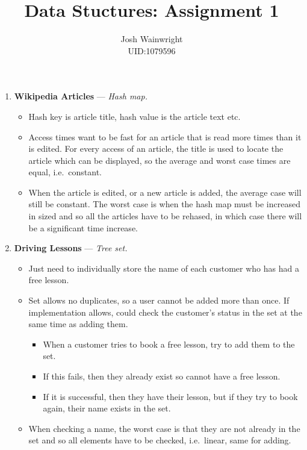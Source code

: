 \documentclass[11pt]{article} %
\author{Josh Wainwright \\ UID:1079596}
\title{Data Stuctures: Assignment 1 }
\date{}
\begin{document}
\maketitle

\begin{enumerate}
	\item \textbf{Wikipedia Articles} --- \textit{Hash map.}

		\begin{itemize}
			\item Hash key is article title, hash value is the article text
				etc.
			\item Access times want to be fast for an article that is read more
				times than it is edited. For every access of an article, the
				title is used to locate the article which can be displayed, so
				the average and worst case times are equal, i.e.\ constant.
			\item When the article is edited, or a new article is added, the
				average case will still be constant. The worst case is when the
				hash map must be increased in sized and so all the articles
				have to be rehased, in which case there will be a significant
				time increase.
		\end{itemize}

	\item \textbf{Driving Lessons } --- \textit{Tree set.}

		\begin{itemize}
			\item Just need to individually store the name of each customer who
				has had a free lesson.
			\item Set allows no duplicates, so a user cannot be added more than
				once.  If implementation allows, could check the customer's
				status in the set at the same time as adding them.
				\begin{itemize}
					\item When a customer tries to book a free lesson, try to
						add them to the set.
					\item If this fails, then they already exist so cannot have
						a free lesson.
					\item If it is successful, then they have their lesson, but
						if they try to book again, their name exists in the
						set.
				\end{itemize}
			\item When checking a name, the worst case is that they are not
				already in the set and so all elements have to be checked,
				i.e.\ linear, same for adding.
		\end{itemize}


\end{enumerate}
\end{document}
